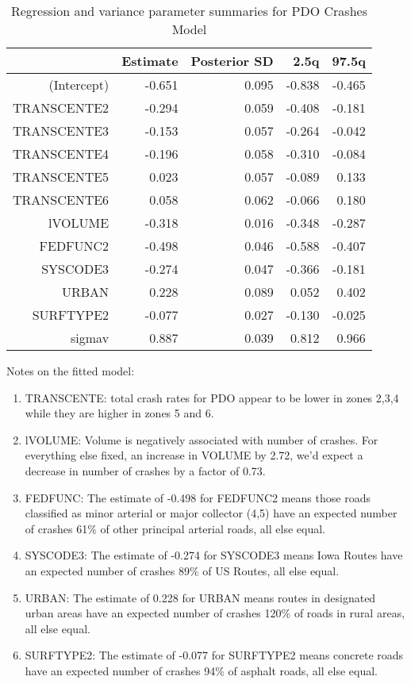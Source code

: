 \documentclass[a4paper]{article}\usepackage[]{graphicx}\usepackage[]{color}
\begin{document}
\begin{table}[h]
\centering
\begin{tabular}{rrrrr}
  \hline
 & Estimate & Posterior SD & 2.5q & 97.5q \\ 
  \hline
(Intercept) & -0.651 & 0.095 & -0.838 & -0.465 \\ 
  TRANSCENTE2 & -0.294 & 0.059 & -0.408 & -0.181 \\ 
  TRANSCENTE3 & -0.153 & 0.057 & -0.264 & -0.042 \\ 
  TRANSCENTE4 & -0.196 & 0.058 & -0.310 & -0.084 \\ 
  TRANSCENTE5 & 0.023 & 0.057 & -0.089 & 0.133 \\ 
  TRANSCENTE6 & 0.058 & 0.062 & -0.066 & 0.180 \\ 
  lVOLUME & -0.318 & 0.016 & -0.348 & -0.287 \\ 
  FEDFUNC2 & -0.498 & 0.046 & -0.588 & -0.407 \\ 
  SYSCODE3 & -0.274 & 0.047 & -0.366 & -0.181 \\ 
  URBAN & 0.228 & 0.089 & 0.052 & 0.402 \\ 
  SURFTYPE2 & -0.077 & 0.027 & -0.130 & -0.025 \\ 
  sigmav & 0.887 & 0.039 & 0.812 & 0.966 \\ 
   \hline
\end{tabular}
\caption{Regression and variance parameter summaries for PDO Crashes Model} 
\label{pdocrash}
\end{table}


Notes on the fitted model:

\begin{enumerate}
\item
TRANSCENTE: total crash rates for PDO appear to be lower in zones 2,3,4 while they are higher in zones 5 and 6. 

\item
lVOLUME: Volume is negatively associated with number of crashes. For everything else fixed, an increase in VOLUME by 2.72, we'd expect a decrease in number of crashes by a factor of 0.73.

\item
FEDFUNC: The estimate of -0.498 for FEDFUNC2 means those roads classified as minor arterial or major collector (4,5) have an expected number of crashes 61\% of other principal arterial roads, all else equal. 

\item
SYSCODE3: The estimate of -0.274 for SYSCODE3 means Iowa Routes have an expected number of crashes 89\% of US Routes, all else equal.

\item
URBAN: The estimate of 0.228 for URBAN means routes in designated urban areas have an expected number of crashes 120\% of roads in rural areas, all else equal.

\item
SURFTYPE2: The estimate of -0.077 for SURFTYPE2 means concrete roads have an expected number of crashes 94\% of asphalt roads, all else equal.

\end{enumerate}
\end{document}
